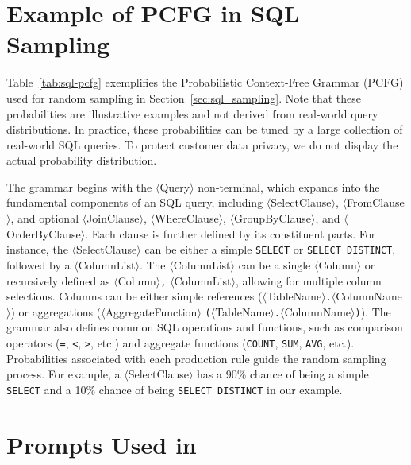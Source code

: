 \section{Example of PCFG in SQL Sampling}
\label{app:pcfg}

Table~\ref{tab:sql-pcfg} exemplifies the Probabilistic Context-Free Grammar (PCFG) used for random sampling in Section~\ref{sec:sql_sampling}.
Note that these probabilities are illustrative examples and not derived from real-world query distributions. In practice, these probabilities can be tuned by a large collection of real-world SQL queries. To protect customer data privacy, we do not display the actual probability distribution. 

The grammar begins with the $\langle$Query$\rangle$ non-terminal, which expands into the fundamental components of an SQL query, including $\langle$SelectClause$\rangle$, $\langle$FromClause$\rangle$, and optional $\langle$JoinClause$\rangle$, $\langle$WhereClause$\rangle$, $\langle$GroupByClause$\rangle$, and $\langle$OrderByClause$\rangle$. Each clause is further defined by its constituent parts. For instance, the $\langle$SelectClause$\rangle$ can be either a simple \texttt{SELECT} or \texttt{SELECT DISTINCT}, followed by a $\langle$ColumnList$\rangle$. The $\langle$ColumnList$\rangle$ can be a single $\langle$Column$\rangle$ or recursively defined as $\langle$Column$\rangle$\texttt{,} $\langle$ColumnList$\rangle$, allowing for multiple column selections. Columns can be either simple references ($\langle$TableName$\rangle$\texttt{.}$\langle$ColumnName$\rangle$) or aggregations ($\langle$AggregateFunction$\rangle$ \texttt{(}$\langle$TableName$\rangle$\texttt{.}$\langle$ColumnName$\rangle$\texttt{)}). The grammar also defines common SQL operations and functions, such as comparison operators (\texttt{=}, \texttt{<}, \texttt{>}, etc.) and aggregate functions (\texttt{COUNT}, \texttt{SUM}, \texttt{AVG}, etc.). 
Probabilities associated with each production rule guide the random sampling process. 
For example, a $\langle$SelectClause$\rangle$ has a 90\% chance of being a simple \texttt{SELECT} and a 10\% chance of being \texttt{SELECT DISTINCT} in our example. 

\section{Prompts Used in {\tool}}
\label{app:prompt}



